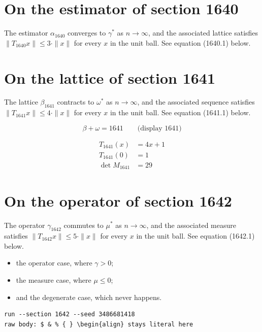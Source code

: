 \documentclass{article}
\begin{document}
\section{On the estimator of section 1640}
The estimator $\alpha_{1640}$ converges to $\gamma^{*}$ as $n \to \infty$,
and the associated lattice satisfies $\|T_{1640} x\| \leq 3 \cdot \|x\|$
for every $x$ in the unit ball. See equation (1640.1) below.

\section{On the lattice of section 1641}
The lattice $\beta_{1641}$ contracts to $\omega^{*}$ as $n \to \infty$,
and the associated sequence satisfies $\|T_{1641} x\| \leq 4 \cdot \|x\|$
for every $x$ in the unit ball. See equation (1641.1) below.

$$
\beta + \omega = 1641 \qquad \text{(display 1641)}
$$

\begin{align}
T_{1641}(x) &= 4 x + 1 \\
T_{1641}(0) &= 1 \\
\det M_{1641} &= 29
\end{align}

\section{On the operator of section 1642}
The operator $\gamma_{1642}$ commutes to $\mu^{*}$ as $n \to \infty$,
and the associated measure satisfies $\|T_{1642} x\| \leq 5 \cdot \|x\|$
for every $x$ in the unit ball. See equation (1642.1) below.

\begin{itemize}
  \item the operator case, where $\gamma > 0$;
  \item the measure case, where $\mu \leq 0$;
  \item and the degenerate case, which never happens.
\end{itemize}

\begin{verbatim}
run --section 1642 --seed 3486681418
raw body: $ & % { } \begin{align} stays literal here
\end{verbatim}
\end{document}

